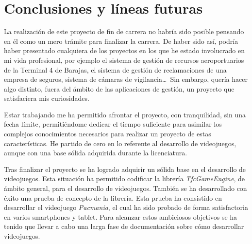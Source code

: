 \chapter{Conclusiones y líneas futuras}

La realización de este proyecto de fin de carrera no habría sido posible pensando en él como un mero trámite para finalizar la carrera. De haber sido así, podría haber presentado cualquiera de los proyectos en los que he estado involucrado en mi vida profesional, por ejemplo el sistema de gestión de recursos aeroportuarios de la Terminal 4 de Barajas, el sistema de gestión de reclamaciones de una empresa de seguros, sistema de cámaras de vigilancia\ldots\ Sin embargo, quería hacer algo distinto, fuera del ámbito de las aplicaciones de gestión, un proyecto que satisfaciera mis curiosidades.
\newline

Estar trabajando me ha permitido afrontar el proyecto, con tranquilidad, sin una fecha límite, permitiéndome dedicar el tiempo suficiente para asimilar los complejos conocimientos necesarios para realizar un proyecto de estas características. He partido de cero en lo referente al desarrollo de videojuegos, aunque con una base sólida adquirida durante la licenciatura.
\newline

Tras finalizar el proyecto se ha logrado adquirir un sólida base en el desarrollo de videojuegos. Esta situación ha permitido codificar la librería \emph{TfcGameEngine}, de ámbito general, para el desarrollo de videojuegos. También se ha desarrollado con éxito una prueba de concepto de la librería. Esta prueba ha consistido en desarrollar el videojuego \emph{Pacmania}, el cual ha sido probado de forma satisfactoria en varios smartphones y tablet. Para alcanzar estos ambiciosos objetivos se ha tenido que llevar a cabo una larga fase de documentación sobre cómo desarrollar videojuegos. 
\newline

